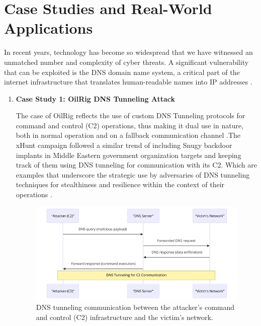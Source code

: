 \section{Case Studies and Real-World Applications}

In recent years, technology has become so widespread that we have witnessed an unmatched number and complexity of cyber threats. A significant vulnerability that can be exploited is the DNS domain name system, a critical part of the internet infrastructure that translates human-readable names into IP addresses \cite{kumari2021sac115}. 

\begin{enumerate} 

\item\textbf{ Case Study 1: OilRig DNS Tunneling Attack }

The case of OilRig reflects the use of custom DNS Tunneling protocols for command and control (C2) operations, thus making it dual use in nature, both in normal operation and on a fallback communication channel \cite{paloaltonetworks2021dnsattacks}.The xHunt campaign \cite{unit42_xhunt_2021} followed a similar trend of including Snugy backdoor implants in Middle Eastern government organization targets and keeping track of them using DNS tunneling for communication with its C2.  Which are examples that underscore the strategic use by adversaries of DNS tunneling techniques for stealthiness and resilience within the context of their operations  \cite{unit42_2021}.

\captionsetup{font= footnotesize}
\begin{figure}[H]
    \centering
    \includegraphics[width=\textwidth]{background/DNSTuu.png}
    \caption{DNS tunneling communication between the attacker's command and control (C2) infrastructure and the victim's network.}
    \label{fig:figTen}
\end{figure}




\end{enumerate}
